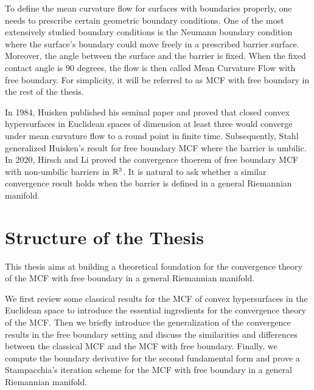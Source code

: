 To define the mean curvature flow for surfaces with boundaries properly, one needs to prescribe certain geometric boundary conditions. One of the most extensively studied boundary conditions is the Neumann boundary condition where the surface's boundary could move freely in a prescribed barrier surface. Moreover, the angle between the surface and the barrier is fixed. When the fixed contact angle is $90$ degrees, the flow is then called Mean Curvature Flow with free boundary. For simplicity, it will be referred to as MCF with free boundary in the rest of the thesis.
 
In 1984, Huisken \cite{huisken_flow_1984} published his seminal paper and proved that closed convex hypersurfaces in Euclidean spaces of dimension at least three would converge under mean curvature flow to a round point in finite time. Subsequently, Stahl \cite{stahl_convergence_1996} generalized Huisken's result for free boundary MCF where the barrier is umbilic. In 2020, Hirsch and Li \cite{hirsch2020contracting} proved the convergence thoerem of free boundary MCF with non-umbilic barriers in $\mathbb{R}^3$. It is natural to ask whether a similar convergence result holds when the barrier is defined in a general Riemannian manifold.

\section{Structure of the Thesis}

This thesis aims at building a theoretical foundation for the convergence theory of the MCF with free boundary in a general Riemannian manifold.

We first review some classical results for the MCF of convex hypersurfaces in the Euclidean space to introduce the essential ingredients for the convergence theory of the MCF. Then we briefly introduce the generalization of the convergence results in the free boundary setting and discuss the similarities and differences between the classical MCF and the MCF with free boundary. Finally. we compute the boundary derivative for the second fundamental form and prove a Stampacchia’s iteration scheme for the MCF with free boundary in a general Riemannian manifold.

\chapterend